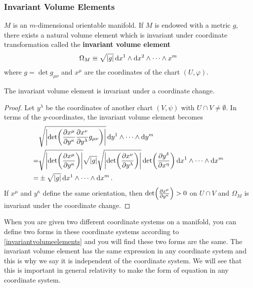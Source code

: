 \documentclass[10pt]{article}
\begin{document}
\subsubsection{Invariant Volume Elements}
\begin{definition}
    $M$ is an $m$-dimensional orientable manifold.
    If $M$ is endowed with a metric $g$, there exists a natural volume element which is invariant under coordinate transformation called the \textbf{invariant volume element}
    \begin{align}\label{invariantvolumeelements}
        \Omega_M\equiv\sqrt{\abs{g}}\dd{x^1}\wedge\dd{x^2}\wedge\dots\wedge{x^m}
    \end{align}
    where $g=\det g_{\mu\nu}$ and $x^\mu$ are the coordinates of the chart $(U,\varphi)$.
\end{definition}
\begin{property}
    The invariant volume element is invariant under a coordinate change.
\end{property}
\begin{proof}
    Let $y^\lambda$ be the coordinates of another chart $(V,\psi)$ with $U\cap V\neq\emptyset$.
    In terms of the $y$-coordinates, the invariant volume element becomes
    \begin{align}
          & \sqrt{\abs{\det(\pdv{x^\mu}{y^\kappa}\pdv{x^\nu}{y^\lambda}g_{\mu\nu})}}\dd{y^1}\wedge\dots\wedge\dd{y^m}\notag                                                    \\
        = & \sqrt{\abs{\det(\pdv{x^\mu}{y^\kappa})}}\sqrt{\abs{g}}\sqrt{\abs{\det(\pdv{x^\nu}{y^\lambda})}}\det(\pdv{y^\delta}{x^\eta})\dd{x^1}\wedge\dots\wedge\dd{x^m}\notag \\
        = & \pm\sqrt{\abs{g}}\dd{x^1}\wedge\dots\wedge\dd{x^m}.
    \end{align}
    If $x^\mu$ and $y^\kappa$ define the same orientation, then $\det(\pdv{x^\mu}{y^\kappa})>0$ on $U\cap V$ and $\Omega_M$ is invariant under the coordinate change.
\end{proof}
\begin{remark}
    When you are given two different coordinate systems on a manifold, you can define two forms in these coordinate systems according to \eqref{invariantvolumeelements} and you will find these two forms are the same.
    The invariant volume element has the same expression in any coordinate system and this is why we say it is independent of the coordinate system.
    We will see that this is important in general relativity to make the form of equation in any coordinate system.
\end{remark}
\end{document}
